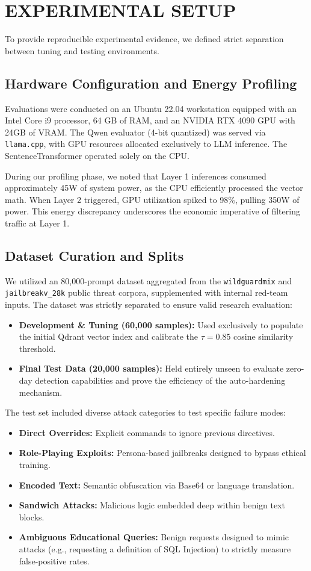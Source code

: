 \documentclass[10pt, conference]{IEEEtran}
\begin{document}
\section{EXPERIMENTAL SETUP}
To provide reproducible experimental evidence, we defined strict separation between tuning and testing environments.

\subsection{Hardware Configuration and Energy Profiling}
Evaluations were conducted on an Ubuntu 22.04 workstation equipped with an Intel Core i9 processor, 64 GB of RAM, and an NVIDIA RTX 4090 GPU with 24GB of VRAM. The Qwen evaluator (4-bit quantized) was served via \texttt{llama.cpp}, with GPU resources allocated exclusively to LLM inference. The SentenceTransformer operated solely on the CPU. 

During our profiling phase, we noted that Layer 1 inferences consumed approximately 45W of system power, as the CPU efficiently processed the vector math. When Layer 2 triggered, GPU utilization spiked to 98\%, pulling 350W of power. This energy discrepancy underscores the economic imperative of filtering traffic at Layer 1.

\subsection{Dataset Curation and Splits}
We utilized an 80,000-prompt dataset aggregated from the \texttt{wildguardmix} and \texttt{jailbreakv\_28k} public threat corpora, supplemented with internal red-team inputs. 
The dataset was strictly separated to ensure valid research evaluation:
\begin{itemize}
    \item \textbf{Development \& Tuning (60,000 samples):} Used exclusively to populate the initial Qdrant vector index and calibrate the $\tau = 0.85$ cosine similarity threshold.
    \item \textbf{Final Test Data (20,000 samples):} Held entirely unseen to evaluate zero-day detection capabilities and prove the efficiency of the auto-hardening mechanism.
\end{itemize}

The test set included diverse attack categories to test specific failure modes:
\begin{itemize}
    \item \textbf{Direct Overrides:} Explicit commands to ignore previous directives.
    \item \textbf{Role-Playing Exploits:} Persona-based jailbreaks designed to bypass ethical training.
    \item \textbf{Encoded Text:} Semantic obfuscation via Base64 or language translation.
    \item \textbf{Sandwich Attacks:} Malicious logic embedded deep within benign text blocks.
    \item \textbf{Ambiguous Educational Queries:} Benign requests designed to mimic attacks (e.g., requesting a definition of SQL Injection) to strictly measure false-positive rates.
\end{itemize}
\end{document}
